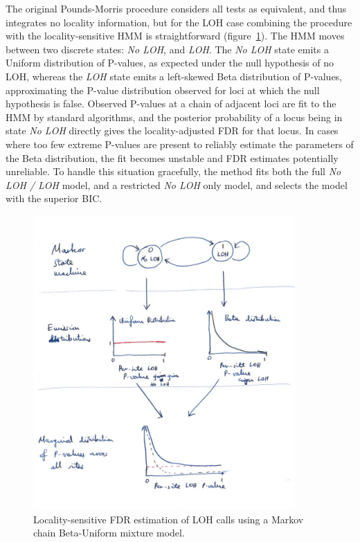 \documentclass[thesis.tex]{subfiles}
\begin{document}
The original Pounds-Morris procedure considers all tests as equivalent, and thus integrates no locality information, but for the \gls{LOH} case combining the procedure with the locality-sensitive \gls{HMM} is straightforward (figure~\ref{fig:comp_loh_hmm}).  The \gls{HMM} moves between two discrete states: \emph{No LOH}, and \emph{LOH}.  The \emph{No LOH} state emits a Uniform distribution of P-values, as expected under the null hypothesis of no \gls{LOH}, whereas the \emph{LOH} state emits a left-skewed Beta distribution of P-values, approximating the P-value distribution observed for loci at which the null hypothesis is false.  Observed P-values at a chain of adjacent loci are fit to the \gls{HMM} by standard algorithms, and the posterior probability of a locus being in state \emph{No LOH} directly gives the locality-adjusted \gls{FDR} for that locus.  In cases where too few extreme P-values are present to reliably estimate the parameters of the Beta distribution, the fit becomes unstable and \gls{FDR} estimates potentially unreliable.  To handle this situation gracefully, the method fits both the full \emph{No LOH / LOH} model, and a restricted \emph{No LOH} only model, and selects the model with the superior \gls{BIC}.

\begin{figure}
\centering
\includegraphics[width=100mm]{resources/comp_loh_hmm.jpg}
\caption{Locality-sensitive FDR estimation of LOH calls using a Markov chain Beta-Uniform mixture model.\label{fig:comp_loh_hmm}}
\end{figure}
\end{document}
